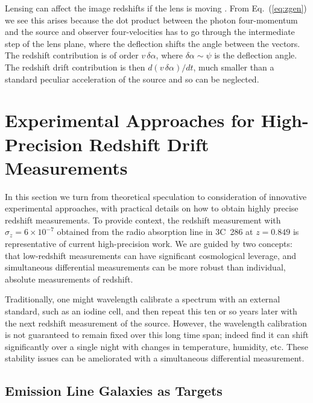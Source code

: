 \documentclass[preprint2, 10pt]{aastex}
\begin{document}
Lensing can affect the image redshifts if the lens is moving 
\citep{mitrofanov,birkgull}.  From 
Eq.~(\ref{eq:zgen}) we see this arises because the dot product between 
the photon four-momentum and the source and observer four-velocities 
has to go through the intermediate step of the lens plane, where the 
deflection shifts the angle between the vectors.  The redshift contribution 
is of order $v\,\delta\alpha$, where $\delta\alpha\sim\psi$ is the 
deflection angle.  The redshift drift contribution is then 
$d(v\,\delta\alpha)/dt$, much smaller than a standard peculiar 
acceleration of the source and so can be neglected. 



\section{Experimental Approaches for High-Precision Redshift Drift Measurements} \label{sec:tech} 

In this section we turn from theoretical speculation to consideration of 
innovative experimental approaches, with practical details on how to 
obtain highly precise redshift measurements. 
To provide context, the redshift measurement with 
$\sigma_z=6\times 10^{-7}$ obtained
from the radio absorption line in 3C~286 at $z=0.849$
\citep{1978ApJ...219....1D} is representative of current high-precision 
work. 
We are guided by two concepts: 
that low-redshift measurements can have significant cosmological leverage, 
and simultaneous differential measurements can be more robust than 
individual, absolute measurements of redshift.  

Traditionally, one might wavelength calibrate a spectrum with an external 
standard, such as an iodine cell, and then repeat this ten or so years 
later with the next redshift measurement of the source.  However, the 
wavelength calibration is not guaranteed to remain fixed over this long time 
span; indeed \citet{griest1,griest2} find it can shift significantly over a 
single night with changes in temperature, humidity, etc.  These stability 
issues can be ameliorated with a simultaneous differential measurement. 


\subsection{Emission Line Galaxies as Targets} 
\end{document}
